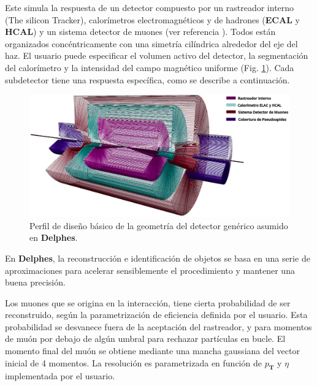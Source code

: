 Este simula la respuesta de un detector compuesto por un rastreador interno (The silicon Tracker), calorímetros electromagnéticos y de hadrones (\textbf{ECAL} y \textbf{HCAL}) y un sistema detector de muones (ver referencia \cite{de_favereau_Delphes_2014}). Todos están organizados concéntricamente con una simetría cilíndrica alrededor del eje del haz. El usuario puede especificar el volumen activo del detector, la segmentación del calorímetro y la intensidad del campo magnético uniforme (Fig. \ref{Delphes}). Cada subdetector tiene una respuesta específica, como se describe a continuación.

\begin{figure}[!h]
    \centering
    \includegraphics[width=1\textwidth]{Analisis_y_Resultados/imagenes/Delphes.png}
    \caption[Perfil de diseño básico de la geometría del detector genérico asumido en  \textbf{Delphes}.]{Perfil de diseño básico de la geometría del detector genérico asumido en  \textbf{Delphes}.\footnotemark}
    \label{Delphes}
\end{figure}


En  \textbf{Delphes}, la reconstrucción e identificación de objetos se basa en una serie de aproximaciones para acelerar sensiblemente el procedimiento y mantener una buena precisión. 

Los muones que se origina en la interacción, tiene cierta probabilidad de ser reconstruido, según la parametrización de eficiencia definida por el usuario. Esta probabilidad se desvanece fuera de la aceptación del rastreador, y para momentos de muón por debajo de algún umbral para rechazar partículas en bucle. El momento final del muón se obtiene mediante una mancha gaussiana del vector inicial de 4 momentos. La resolución es parametrizada en función de $p_\mathbf{T}$ y $\eta$ implementada por el usuario.


